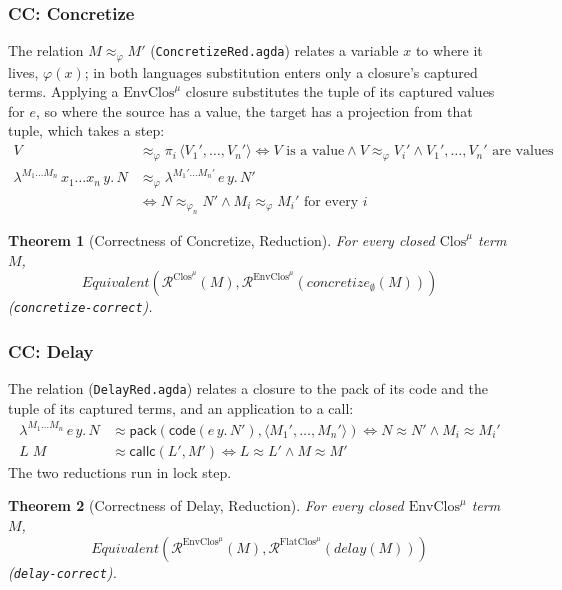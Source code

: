 \documentclass[10pt]{article}
\theoremstyle{acmplain}
\newtheorem{theorem}{Theorem}[section]
\newcommand{\key}[1]{\mathsf{#1}}
\newcommand{\pass}[1]{\mathit{#1}}
\newcommand{\clos}[2]{\lambda^{#1}\, #2.\,}
\newcommand{\tuple}[1]{\langle #1 \rangle}
\newcommand{\prj}[1]{\pi_{#1}\,}
\newcommand{\Equiv}{\mathit{Equivalent}}
\newcommand{\Tcodetm}[3]{\key{code}(#1\,#2.\,#3)}  %
\newcommand{\Tpack}[2]{\key{pack}(#1, #2)}     %
\newcommand{\Tcallc}[2]{\key{callc}(#1, #2)}   %
\newcommand{\Ml}[1]{\textrm{#1}^{\mu}}                  %
\begin{document}
\subsubsection{CC: Concretize}

The relation $M \approx_\varphi M'$ (\texttt{ConcretizeRed.agda}) relates a
variable $x$ to where it lives, $\varphi(x)$; in both languages substitution
enters only a closure's captured terms. Applying a $\Ml{EnvClos}$ closure
substitutes the tuple of its captured values for $e$, so where the source
has a value, the target has a projection from that tuple, which takes a
step:
\begin{align*}
  V &\approx_\varphi \prj{i} \tuple{V_1', \ldots, V_n'}
    \iff V \text{ is a value} \land V \approx_\varphi V_i' \land V_1', \ldots, V_n' \text{ are values} \\
  \clos{M_1\ldots M_n}{x_1\ldots x_n\, y} N &\approx_\varphi \clos{M_1'\ldots M_n'}{e\, y} N' \\
    &\iff N \approx_{\varphi_n} N' \land M_i \approx_\varphi M_i' \text{ for every } i
\end{align*}
\begin{theorem}[Correctness of Concretize, Reduction]\label{thm:m-red-concretize}
For every closed $\Ml{Clos}$ term $M$,
\[ \Equiv(\mathcal{R}^{\Ml{Clos}}(M), \mathcal{R}^{\Ml{EnvClos}}(\pass{concretize}_{\emptyset}(M))) \]
(\texttt{concretize-correct}).
\end{theorem}

\subsubsection{CC: Delay}

The relation (\texttt{DelayRed.agda}) relates a closure to the pack of its
code and the tuple of its captured terms, and an application to a call:
\begin{align*}
  \clos{M_1\ldots M_n}{e\, y} N &\approx \Tpack{\Tcodetm{e}{y}{N'}}{\tuple{M_1', \ldots, M_n'}}
    \iff N \approx N' \land M_i \approx M_i' \\
  L\;M &\approx \Tcallc{L'}{M'} \iff L \approx L' \land M \approx M'
\end{align*}
The two reductions run in lock step.
\begin{theorem}[Correctness of Delay, Reduction]\label{thm:m-red-delay}
For every closed $\Ml{EnvClos}$ term $M$,
\[ \Equiv(\mathcal{R}^{\Ml{EnvClos}}(M), \mathcal{R}^{\Ml{FlatClos}}(\pass{delay}(M))) \]
(\texttt{delay-correct}).
\end{theorem}
\end{document}
